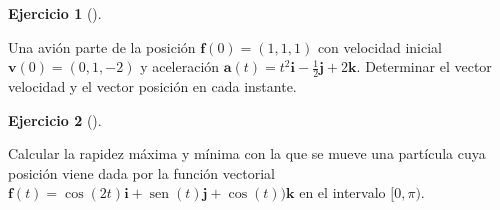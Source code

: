 \documentclass[
  a4paper,
]{scrreport}
\theoremstyle{definition}
\newtheorem{exercise}{Ejercicio}[chapter]
\theoremstyle{remark}
\begin{document}
\begin{exercise}[]\protect\hypertarget{exr-cinematica-avion}{}\label{exr-cinematica-avion}

Una avión parte de la posición \(\mathbf{f}(0)=(1, 1, 1)\) con velocidad
inicial \(\mathbf{v}(0)=(0,1,-2)\) y aceleración
\(\mathbf{a}(t)=t^2\mathbf{i}-\frac{1}{2}\mathbf{j}+2\mathbf{k}\).
Determinar el vector velocidad y el vector posición en cada instante.

\end{exercise}

\begin{exercise}[]\protect\hypertarget{exr-cinematica}{}\label{exr-cinematica}

Calcular la rapidez máxima y mínima con la que se mueve una partícula
cuya posición viene dada por la función vectorial
\(\mathbf{f}(t) = \cos(2t)\mathbf{i} + \operatorname{sen}(t)\mathbf{j} + \cos(t))\mathbf{k}\)
en el intervalo \([0,\pi)\).

\end{exercise}
\end{document}
